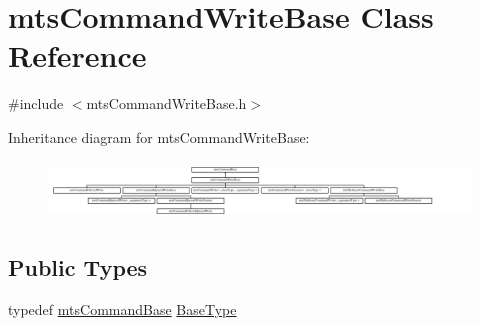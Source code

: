 \hypertarget{classmts_command_write_base}{\section{mts\-Command\-Write\-Base Class Reference}
\label{classmts_command_write_base}
}


{\ttfamily \#include $<$mts\-Command\-Write\-Base.\-h$>$}

Inheritance diagram for mts\-Command\-Write\-Base\-:\begin{figure}[H]
\begin{center}
\leavevmode
\includegraphics[height=1.525054cm]{da/d89/classmts_command_write_base}
\end{center}
\end{figure}
\subsection*{Public Types}
\begin{DoxyCompactItemize}
\item 
typedef \hyperlink{classmts_command_base}{mts\-Command\-Base} \hyperlink{classmts_command_write_base_a5d78c8590cfc73fa29d93b3678cba199}{Base\-Type}
\end{DoxyCompactItemize}
